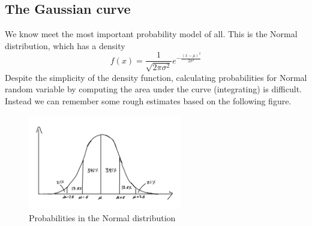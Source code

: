   \subsection{The Gaussian curve}
We know meet the most important probability model of all. This is the Normal distribution, which has a density 
   \begin{equation*}
   f(x) = \frac{1}{\sqrt{2\pi \sigma^2}}e^{-\frac{(x-\mu)^2}{2 \sigma^2}}
   \end{equation*}
 Despite the simplicity of the density function, calculating probabilities for Normal random variable by computing the area under the curve (integrating) is difficult. Instead we can remember some rough estimates based on the following figure. 

\begin{figure}[h]
\centering
\includegraphics[width=0.6\textwidth]{./../figures/bellcurve}
\caption{Probabilities in the Normal distribution}\label{fig:bellcurve}
\end{figure}



